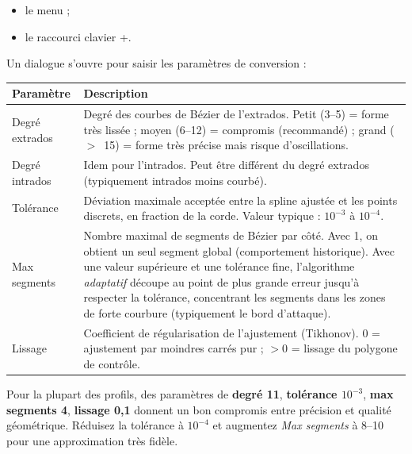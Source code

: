 \begin{itemize}
    \item le menu  ;
    \item le raccourci clavier +.
\end{itemize}

Un dialogue s'ouvre pour saisir les paramètres de conversion :


\begin{tabularx}{\linewidth}{l X}
    \toprule
    \textbf{Paramètre} & \textbf{Description} \\
    \midrule
    Degré extrados
        & Degré des courbes de Bézier de l'extrados.
          Petit (3--5) = forme très lissée ; moyen (6--12) =
          compromis (recommandé) ; grand ($>$~15) = forme très
          précise mais risque d'oscillations.\\
    Degré intrados
        & Idem pour l'intrados. Peut être différent du degré
          extrados (typiquement intrados moins courbé).\\
    Tolérance
        & Déviation maximale acceptée entre la spline ajustée
          et les points discrets, en fraction de la corde.
          Valeur typique : $10^{-3}$ à $10^{-4}$.\\
    Max segments
        & Nombre maximal de segments de Bézier par côté.
          Avec 1, on obtient un seul segment global (comportement
          historique). Avec une valeur supérieure et une
          tolérance fine, l'algorithme \emph{adaptatif} découpe
          au point de plus grande erreur jusqu'à respecter la
          tolérance, concentrant les segments dans les zones de
          forte courbure (typiquement le bord d'attaque).\\
    Lissage
        & Coefficient de régularisation de l'ajustement
          (Tikhonov). $0$ = ajustement par moindres carrés pur ;
          $>0$ = lissage du polygone de contrôle.\\
    \bottomrule
\end{tabularx}

\begin{astuce}
Pour la plupart des profils, des paramètres de
\textbf{degré 11}, \textbf{tolérance $10^{-3}$},
\textbf{max segments 4}, \textbf{lissage 0{,}1} donnent un bon
compromis entre précision et qualité géométrique. Réduisez
la tolérance à $10^{-4}$ et augmentez \emph{Max segments} à
8--10 pour une approximation très fidèle.
\end{astuce}

